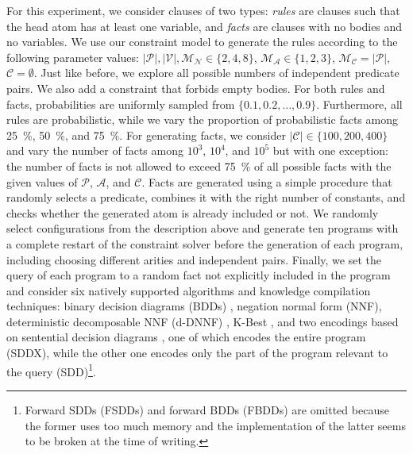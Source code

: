 \documentclass[runningheads]{llncs}
\newcommand{\predicates}{\mathcal{P}}
\newcommand{\variables}{\mathcal{V}}
\newcommand{\constants}{\mathcal{C}}
\newcommand{\arities}{\mathcal{A}}
\newcommand{\maxArity}{\mathcal{M}_{\mathcal{A}}}
\newcommand{\maxNumNodes}{\mathcal{M}_{\mathcal{N}}}
\newcommand{\maxNumClauses}{\mathcal{M}_{\mathcal{C}}}
\begin{document}
For this experiment, we consider clauses of two types: \emph{rules} are clauses
such that the head atom has at least one variable, and \emph{facts} are clauses
with no bodies and no variables. We use our constraint model to generate the
rules according to the following parameter values: $|\predicates{}|,
|\variables{}|, \maxNumNodes{} \in \{ 2, 4, 8 \}$, $\maxArity{} \in \{ 1, 2, 3
\}$, $\maxNumClauses{} = |\predicates{}|$, $\constants{} = \emptyset$. Just like
before, we explore all possible numbers of independent predicate pairs. We also
add a constraint that forbids empty bodies. For both rules and facts,
probabilities are uniformly sampled from $\{ 0.1, 0.2, \dots, 0.9 \}$.
Furthermore, all rules are probabilistic, while we vary the proportion of
probabilistic facts among \SI{25}{\percent}, \SI{50}{\percent}, and
\SI{75}{\percent}. For generating facts, we consider $|\constants{}| \in \{100,
200, 400 \}$ and vary the number of facts among $10^3$, $10^4$, and $10^5$ but
with one exception: the number of facts is not allowed to exceed
\SI{75}{\percent} of all possible facts with the given values of
$\predicates{}$, $\arities{}$, and $\constants{}$. Facts are generated using a
simple procedure that randomly selects a predicate, combines it with the right
number of constants, and checks whether the generated atom is already included
or not. We randomly select configurations from the description above and
generate ten programs with a complete restart of the constraint solver before
the generation of each program, including choosing different arities and
independent pairs. Finally, we set the query of each program to a random fact
not explicitly included in the program and consider six natively supported
algorithms and knowledge compilation techniques: binary decision diagrams (BDDs)
\cite{DBLP:journals/tc/Bryant86}, negation normal form (NNF), deterministic
decomposable NNF (d-DNNF) \cite{DBLP:journals/jair/DarwicheM02}, K-Best
\cite{DBLP:conf/pkdd/GutmannKKR08}, and two encodings based on sentential
decision diagrams \cite{DBLP:conf/ijcai/Darwiche11}, one of which encodes the
entire program (SDDX), while the other one encodes only the part of the program
relevant to the query (SDD)\footnote{Forward SDDs (FSDDs) and forward BDDs
  (FBDDs)
  \cite{DBLP:journals/corr/abs-1911-07750,DBLP:conf/ijcai/VlasselaerBKMR15} are
  omitted because the former uses too much memory and the implementation of the
  latter seems to be broken at the time of writing.}.
\end{document}
